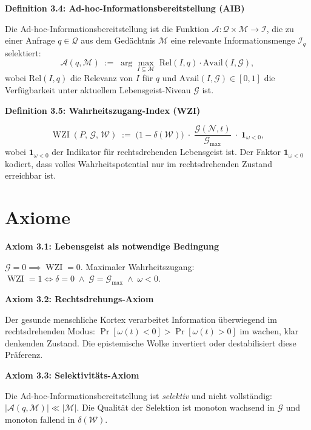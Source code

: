 ﻿\documentclass[12pt,a4paper]{report}
\theoremstyle{plain}
\theoremstyle{definition}
\theoremstyle{remark}
\DeclareMathOperator{\WZI}{WZI}
\begin{document}
	
	
	\noindent\textbf{Definition 3.4: Ad-hoc-Informationsbereitstellung (AIB)}

		\label{def:aib}
		Die Ad-hoc-Informationsbereitstellung ist die Funktion
		$\mathcal{A}: \mathcal{Q} \times \mathcal{M} \to \mathcal{I}$,
		die zu einer Anfrage $q \in \mathcal{Q}$ aus dem Gedächtnis $\mathcal{M}$
		eine relevante Informationsmenge $\mathcal{I}_{q}$ selektiert:
		\[
		\mathcal{A}(q, \mathcal{M})
		\;:=\;
		\arg\max_{I \subseteq \mathcal{M}}
		\;\mathrm{Rel}(I, q) \cdot \mathrm{Avail}(I, \mathcal{G}),
		\]
		wobei $\mathrm{Rel}(I,q)$ die Relevanz von $I$ für $q$
		und $\mathrm{Avail}(I, \mathcal{G}) \in [0,1]$ die Verfügbarkeit
		unter aktuellem Lebensgeist-Niveau $\mathcal{G}$ ist.

	
	
	\noindent\textbf{Definition 3.5: Wahrheitszugang-Index (WZI)}

		\[
		\WZI(P,\,\mathcal{G},\,\mathcal{W})
		\;:=\;
		\bigl(1 - \delta(\mathcal{W})\bigr)
		\;\cdot\;
		\frac{\mathcal{G}(\mathcal{N},t)}{\mathcal{G}_{\max}}
		\;\cdot\;
		\mathbf{1}_{\omega < 0},
		\]
		wobei $\mathbf{1}_{\omega < 0}$ der Indikator für rechtsdrehenden
		Lebensgeist ist. Der Faktor $\mathbf{1}_{\omega < 0}$ kodiert, dass
		volles Wahrheitspotential nur im rechtsdrehenden Zustand erreichbar ist.

	
	\section{Axiome}
	
	
	\noindent\textbf{Axiom 3.1: Lebensgeist als notwendige Bedingung}

		$\mathcal{G} = 0 \implies \WZI = 0$.
		Maximaler Wahrheitszugang:
		$\WZI = 1 \iff \delta = 0 \;\wedge\; \mathcal{G} = \mathcal{G}_{\max}
		\;\wedge\; \omega < 0$.

	
	
	\noindent\textbf{Axiom 3.2: Rechtsdrehungs-Axiom}

		Der gesunde menschliche Kortex verarbeitet Information überwiegend
		im rechtsdrehenden Modus: $\Pr[\omega(t) < 0] > \Pr[\omega(t) > 0]$
		im wachen, klar denkenden Zustand.
		Die epistemische Wolke invertiert oder destabilisiert diese Präferenz.

	
	
	\noindent\textbf{Axiom 3.3: Selektivitäts-Axiom}

		Die Ad-hoc-Informationsbereitstellung ist \emph{selektiv} und nicht
		vollständig: $|\mathcal{A}(q,\mathcal{M})| \ll |\mathcal{M}|$.
		Die Qualität der Selektion ist monoton wachsend in $\mathcal{G}$
		und monoton fallend in $\delta(\mathcal{W})$.
\end{document}

